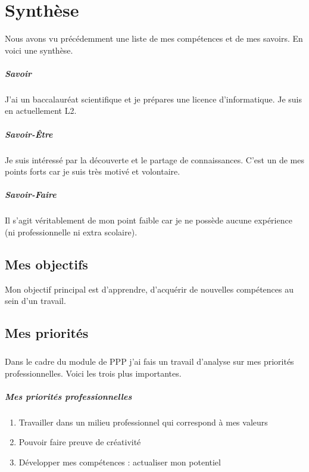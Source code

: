 \documentclass[a4paper,12pt, draft]{report}
\begin{document}
\chapter{Synthèse} \label{RefSyntheseBilanPerso}
Nous avons vu précédemment une liste de mes compétences et de mes savoirs.
En voici une synthèse.

\paragraph{Savoir}
J'ai un baccalauréat scientifique et je prépares une licence d'informatique.
Je suis en actuellement L2.

\paragraph{Savoir-Être}
Je suis intéressé par la découverte et le partage de connaissances. C'est un de mes points forts car je suis très motivé et volontaire.

\paragraph{Savoir-Faire}
Il s'agit véritablement de mon point faible car je ne possède aucune expérience (ni professionnelle ni extra scolaire).

\section{Mes objectifs}
Mon objectif principal est d'apprendre, d'acquérir de nouvelles compétences au sein d'un travail.
\section{Mes priorités}
\paragraph{}
Dans le cadre du module de PPP j'ai fais un travail d'analyse sur mes priorités professionnelles. Voici les trois plus importantes.


\paragraph{Mes priorités professionnelles}
\begin{enumerate}
\item Travailler dans un milieu professionnel qui correspond à mes valeurs
\item Pouvoir faire preuve de créativité
\item Développer mes compétences : actualiser mon potentiel
\end{enumerate}
\end{document}
